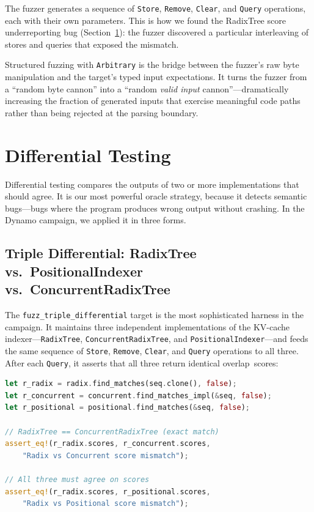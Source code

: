 The fuzzer generates a sequence of \texttt{Store}, \texttt{Remove}, \texttt{Clear}, and \texttt{Query} operations, each with their own parameters. This is how we found the RadixTree score underreporting bug (Section~\ref{sec:fuzzing:differential}): the fuzzer discovered a particular interleaving of stores and queries that exposed the mismatch.

\begin{insightbox}
Structured fuzzing with \texttt{Arbitrary} is the bridge between the fuzzer's raw byte manipulation and the target's typed input expectations. It turns the fuzzer from a ``random byte cannon'' into a ``random \emph{valid input} cannon''---dramatically increasing the fraction of generated inputs that exercise meaningful code paths rather than being rejected at the parsing boundary.
\end{insightbox}

\section{Differential Testing}
\label{sec:fuzzing:differential}

Differential testing compares the outputs of two or more implementations that should agree. It is our most powerful oracle strategy, because it detects semantic bugs---bugs where the program produces wrong output without crashing. In the Dynamo campaign, we applied it in three forms.

\subsection{Triple Differential: RadixTree vs.\ PositionalIndexer vs.\ ConcurrentRadixTree}

The \texttt{fuzz\_triple\_differential} target is the most sophisticated harness in the campaign. It maintains three independent implementations of the KV-cache indexer---\texttt{Radix\-Tree}, \texttt{Concurrent\-Radix\-Tree}, and \texttt{Positional\-Indexer}---and feeds the same sequence of \texttt{Store}, \texttt{Remove}, \texttt{Clear}, and \texttt{Query} operations to all three. After each \texttt{Query}, it asserts that all three return identical overlap~scores:

\begin{lstlisting}[language=Rust,caption={Triple differential: three implementations must agree on every query.}]
let r_radix = radix.find_matches(seq.clone(), false);
let r_concurrent = concurrent.find_matches_impl(&seq, false);
let r_positional = positional.find_matches(&seq, false);

// RadixTree == ConcurrentRadixTree (exact match)
assert_eq!(r_radix.scores, r_concurrent.scores,
    "Radix vs Concurrent score mismatch");

// All three must agree on scores
assert_eq!(r_radix.scores, r_positional.scores,
    "Radix vs Positional score mismatch");
\end{lstlisting}

